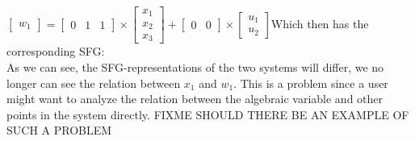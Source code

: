 \newline
$\left[ \begin{array}{c} w_1  \end{array} \right]
=  \begin{bmatrix} 0 & 1 & 1\end{bmatrix} \times \left[ \begin{array}{c} x_1 \\ x_2 \\ x_3 \end{array} \right] + \begin{bmatrix} 0 & 0 \end{bmatrix} \times \left[ \begin{array}{c} u_1 \\ u_2 \end{array} \right]$\newline Which then has the corresponding SFG:\newline
\setlength\fboxsep{0pt}
\setlength\fboxrule{0.5pt}
\\\newline
As we can see, the SFG-representations of the two systems will differ, we no longer can see the relation between $x_1$ and $w_1$. This is a problem since a user might want to analyze the relation between the algebraic variable and other points in the system directly.
FIXME SHOULD THERE BE AN EXAMPLE OF SUCH A PROBLEM
%
%
%
